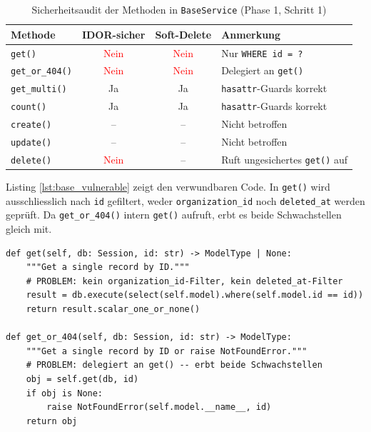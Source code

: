 \begin{table}[H]
    \begin{center}
        \renewcommand{\arraystretch}{1.4}
        \begin{tabular}{|l|c|c|p{4.5cm}|}
            \hline
            \textbf{Methode}        & \textbf{IDOR-sicher}           & \textbf{Soft-Delete}           & \textbf{Anmerkung}                    \\
            \hline
            \texttt{get()}          & \textcolor{red}{Nein}          & \textcolor{red}{Nein}          & Nur \texttt{WHERE id = ?}             \\
            \texttt{get\_or\_404()} & \textcolor{red}{Nein}          & \textcolor{red}{Nein}          & Delegiert an \texttt{get()}           \\
            \texttt{get\_multi()}   & \textcolor{green!60!black}{Ja} & \textcolor{green!60!black}{Ja} & \texttt{hasattr}-Guards korrekt       \\
            \texttt{count()}        & \textcolor{green!60!black}{Ja} & \textcolor{green!60!black}{Ja} & \texttt{hasattr}-Guards korrekt       \\
            \texttt{create()}       & --                             & --                             & Nicht betroffen                       \\
            \texttt{update()}       & --                             & --                             & Nicht betroffen                       \\
            \texttt{delete()}       & \textcolor{red}{Nein}          & --                             & Ruft ungesichertes \texttt{get()} auf \\
            \hline
        \end{tabular}
    \end{center}
    \caption{Sicherheitsaudit der Methoden in \texttt{BaseService} (Phase 1, Schritt 1)}
    \label{tab:baseservice_audit}
\end{table}

Listing \ref{lst:base_vulnerable} zeigt den verwundbaren Code. In \texttt{get()} wird
ausschliesslich nach \texttt{id} gefiltert, weder \texttt{organization\_id} noch
\texttt{deleted\_at} werden geprüft. Da \texttt{get\_or\_404()} intern \texttt{get()}
aufruft, erbt es beide Schwachstellen gleich mit.

\begin{lstlisting}[style=custompython,
  caption={Verwundbare Methoden in \texttt{base.py} -- Zeilen 24--34},
  label={lst:base_vulnerable}]
def get(self, db: Session, id: str) -> ModelType | None:
    """Get a single record by ID."""
    # PROBLEM: kein organization_id-Filter, kein deleted_at-Filter
    result = db.execute(select(self.model).where(self.model.id == id))
    return result.scalar_one_or_none()

def get_or_404(self, db: Session, id: str) -> ModelType:
    """Get a single record by ID or raise NotFoundError."""
    # PROBLEM: delegiert an get() -- erbt beide Schwachstellen
    obj = self.get(db, id)
    if obj is None:
        raise NotFoundError(self.model.__name__, id)
    return obj
\end{lstlisting}

